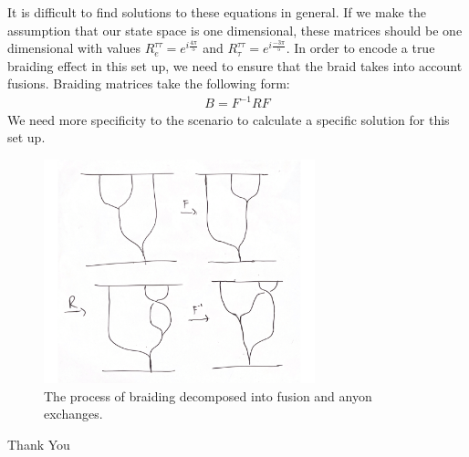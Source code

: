 \documentclass[compress,aspectratio=169,10pt,usenames,dvipsnames]{beamer}
\begin{document}
\begin{frame}
\vfill 
It is difficult to find solutions to these equations in general. If we make the assumption that our state space is one dimensional, these matrices should be one dimensional with values $R^{\tau\tau}_e = e^{i\frac{4\pi}{5}}$ and $R^{\tau\tau}_\tau = e^{i\frac{-3\pi}{5}}$.
\vfill
In order to encode a true braiding effect in this set up, we need to ensure that the braid takes into account fusions. Braiding matrices take the following form:
\begin{equation}
	\begin{aligned}
		B = F^{-1}R F
	\end{aligned}
\end{equation}
\vfill
We need more specificity to the scenario to calculate a specific solution for this set up.
\end{frame}
%
%
\begin{frame}
\vfill
\begin{figure}[H]
	\centering
	\includegraphics[width=0.7\textwidth]{braid.png}
	\caption{The process of braiding decomposed into fusion and anyon exchanges.}
\end{figure}
\vfill 

\end{frame}


\begin{frame}
\vfill
Thank You
\vfill
\end{frame}


\end{document}
